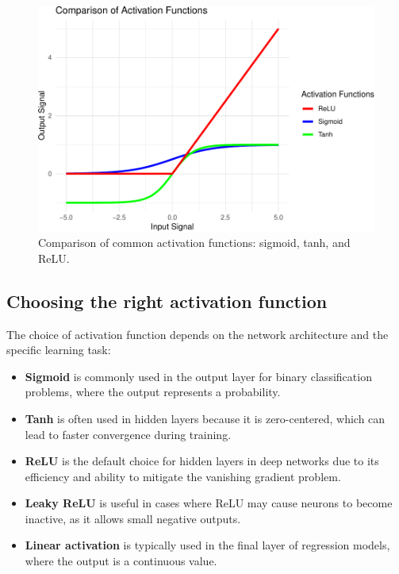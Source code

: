 \documentclass[
]{book}
\providecommand{\tightlist}{%
  \setlength{\itemsep}{0pt}\setlength{\parskip}{0pt}}
\theoremstyle{definition}
\theoremstyle{definition}
\theoremstyle{definition}
\theoremstyle{definition}
\theoremstyle{remark}
\begin{document}
\begin{figure}

{\centering \includegraphics[width=0.8\linewidth]{nn_files/figure-latex/active-fun-comparison-1} 

}

\caption{Comparison of common activation functions: sigmoid, tanh, and ReLU.}\label{fig:active-fun-comparison}
\end{figure}

\subsection*{Choosing the right activation function}\label{choosing-the-right-activation-function}

The choice of activation function depends on the network architecture and the specific learning task:

\begin{itemize}
\tightlist
\item
  \textbf{Sigmoid} is commonly used in the output layer for binary classification problems, where the output represents a probability.
\item
  \textbf{Tanh} is often used in hidden layers because it is zero-centered, which can lead to faster convergence during training.\\
\item
  \textbf{ReLU} is the default choice for hidden layers in deep networks due to its efficiency and ability to mitigate the vanishing gradient problem.\\
\item
  \textbf{Leaky ReLU} is useful in cases where ReLU may cause neurons to become inactive, as it allows small negative outputs.\\
\item
  \textbf{Linear activation} is typically used in the final layer of regression models, where the output is a continuous value.
\end{itemize}
\end{document}
